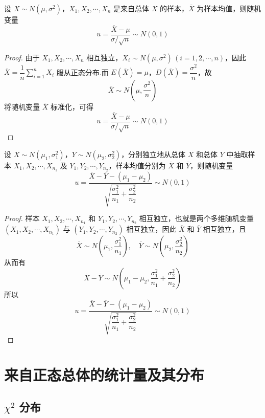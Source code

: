 \begin{theorem} \label{theorem:正态总体的样本均值服从正态分布}
    设 $X \sim N(\mu, \sigma^2)$，$X_1, X_2, \cdots, X_n$ 是来自总体 $X$ 的样本，$\overline{X}$ 为样本均值，则随机变量
    $$
    u = \dfrac{\overline{X} - \mu}{\sigma / \sqrt{n}} \sim N(0,1)
    $$
\end{theorem}

\begin{proof}
    由于 $X_1, X_2, \cdots, X_n$ 相互独立，$X_i \sim N(\mu, \sigma^2) \, (i=1,2,\cdots,n)$，因此 $\overline{X} = \dfrac{1}{n} \displaystyle\sum_{i=1}^n X_i$ 服从正态分布.而 $E(\overline{X}) = \mu$，$D(\overline{X}) = \dfrac{\sigma^2}{n}$，故
    $$
    \overline{X} \sim N(\mu, \dfrac{\sigma^2}{n})
    $$
    将随机变量 $\overline{X}$ 标准化，可得
    $$
    u = \dfrac{\overline{X} - \mu}{\sigma / \sqrt{n}} \sim N(0,1)
    $$
\end{proof}

\begin{theorem} \label{theorem:两个正太总体的样本均值}
    设 $X \sim N(\mu_1, \sigma_1^2)$，$Y \sim N(\mu_2, \sigma_2^2)$，分别独立地从总体 $X$ 和总体 $Y$ 中抽取样本 $X_1, X_2, \cdots, X_{n_1}$ 及 $Y_1, Y_2, \cdots, Y_{n_2}$，样本均值分别为 $\overline{X}$ 和 $\overline{Y}$，则随机变量
    $$
    u = \dfrac{\overline{X} - \overline{Y} - (\mu_1 - \mu_2)}{\sqrt{\dfrac{\sigma_1^2}{n_1} + \dfrac{\sigma_2^2}{n_2}}} \sim N(0,1)
    $$
\end{theorem}

\begin{proof}
    样本 $X_1, X_2, \cdots, X_{n_1}$ 和 $Y_1, Y_2, \cdots, Y_{n_2}$ 相互独立，也就是两个多维随机变量 $(X_1, X_2, \cdots, X_{n_1})$ 与 $(Y_1, Y_2, \cdots, Y_{n_2})$ 相互独立，因此 $\overline{X}$ 和 $\overline{Y}$ 相互独立，且
    $$
    \overline{X} \sim N(\mu_1, \dfrac{\sigma_1^2}{n_1}), \quad \overline{Y} \sim N(\mu_2, \dfrac{\sigma_2^2}{n_2})
    $$
    从而有
    $$
    \overline{X} - \overline{Y} \sim N(\mu_1 - \mu_2, \dfrac{\sigma_1^2}{n_1} + \dfrac{\sigma_2^2}{n_2})
    $$
    所以
    $$
    u = \dfrac{\overline{X} - \overline{Y} - (\mu_1 - \mu_2)}{\sqrt{\dfrac{\sigma_1^2}{n_1} + \dfrac{\sigma_2^2}{n_2}}} \sim N(0,1)
    $$
\end{proof}

\section{来自正态总体的统计量及其分布}

\subsection{\texorpdfstring{$\chi^2$}{} 分布}

